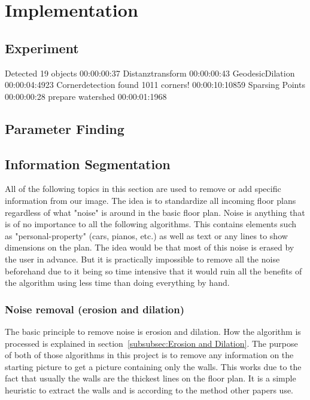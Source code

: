 \section{Implementation}

\subsection{Experiment}

Detected 19 objects
00:00:00:37
Distanztransform
00:00:00:43
GeodesicDilation
00:00:04:4923
Cornerdetection
found 1011 corners!
00:00:10:10859
Sparsing Points
00:00:00:28
prepare watershed
00:00:01:1968

\subsection{Parameter Finding}
\label{subsec:Parameter Finding}

\subsection{Information Segmentation}
All of the following topics in this section are used to remove or add specific information from our image. The idea is to standardize all incoming floor plans regardless of what "noise" is around in the basic floor plan. Noise is anything that is of no importance to all the following algorithms. This contains elements such as "personal-property" (cars, pianos, etc.) as well as text or any lines to show dimensions on the plan. The idea would be that most of this noise is erased by the user in advance. But it is practically impossible to remove all the noise beforehand due to it being so time intensive that it would ruin all the benefits of the algorithm using less time than doing everything by hand. 
\subsubsection{Noise removal (erosion and dilation)}
The basic principle to remove noise is erosion and dilation. How the algorithm is processed is explained in section~\ref{subsubsec:Erosion and Dilation}.
The purpose of both of those algorithms in this project is to remove any information on the starting picture to get a picture containing only the walls. This works due to the fact that usually the walls are the thickest lines on the floor plan. It is a simple heuristic to extract the walls and is according to the method other papers use. 

